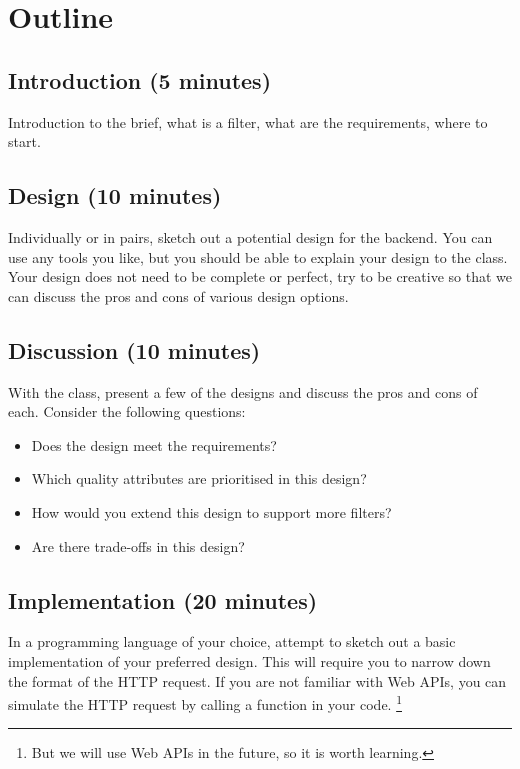 \documentclass{csse4400}
\begin{document}
\section{Outline}

\subsection*{Introduction (5 minutes)}
Introduction to the brief, what is a filter, what are the requirements, where to start.

\subsection*{Design (10 minutes)}
Individually or in pairs, sketch out a potential design for the backend.
You can use any tools you like, but you should be able to explain your design to the class.
Your design does not need to be complete or perfect,
try to be creative so that we can discuss the pros and cons of various design options.

\subsection*{Discussion (10 minutes)}
With the class, present a few of the designs and discuss the pros and cons of each.
Consider the following questions:
\begin{itemize}
    \item Does the design meet the requirements?
    \item Which quality attributes are prioritised in this design?
    \item How would you extend this design to support more filters?
    \item Are there trade-offs in this design?
\end{itemize}


\subsection*{Implementation (20 minutes)}
In a programming language of your choice,
attempt to sketch out a basic implementation of your preferred design.
This will require you to narrow down the format of the HTTP request.
If you are not familiar with Web APIs,
you can simulate the HTTP request by calling a function in your code.%
\footnote{But we will use Web APIs in the future, so it is worth learning.}
\end{document}
